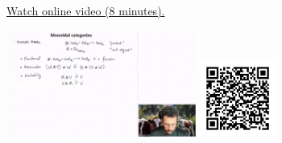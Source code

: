 
\begin{minipage}{10cm}
    \href{https://act4e-spring21.netlify.app/videos/spring2021-par-feedback:mon-cat:mon-cat-def.html}{Watch online video (8 minutes).}
        
    \href{https://act4e-spring21.netlify.app/videos/spring2021-par-feedback:mon-cat:mon-cat-def.html}{\includegraphics[height=3.5cm]{spring2021-par-feedback:mon-cat:mon-cat-def/thumbnails.jpg}}
    \href{https://act4e-spring21.netlify.app/videos/spring2021-par-feedback:mon-cat:mon-cat-def.html}{\includegraphics[height=2.5cm]{spring2021-par-feedback:mon-cat:mon-cat-def/qrcode.png}}
\end{minipage}
